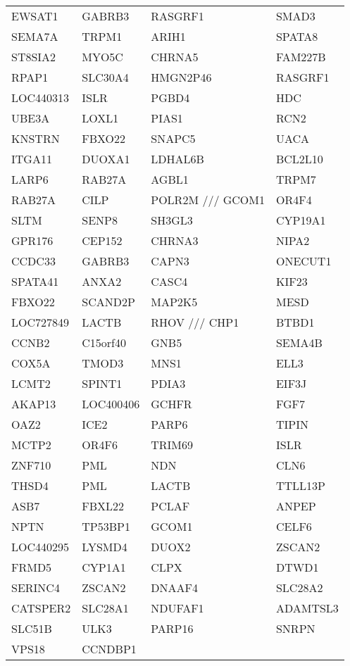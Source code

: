 {\begin{longtable}{llll}
EWSAT1&GABRB3&RASGRF1&SMAD3\tabularnewline
SEMA7A&TRPM1&ARIH1&SPATA8\tabularnewline
ST8SIA2&MYO5C&CHRNA5&FAM227B\tabularnewline
RPAP1&SLC30A4&HMGN2P46&RASGRF1\tabularnewline
LOC440313&ISLR&PGBD4&HDC\tabularnewline
UBE3A&LOXL1&PIAS1&RCN2\tabularnewline
KNSTRN&FBXO22&SNAPC5&UACA\tabularnewline
ITGA11&DUOXA1&LDHAL6B&BCL2L10\tabularnewline
LARP6&RAB27A&AGBL1&TRPM7\tabularnewline
RAB27A&CILP&POLR2M /// GCOM1&OR4F4\tabularnewline
SLTM&SENP8&SH3GL3&CYP19A1\tabularnewline
GPR176&CEP152&CHRNA3&NIPA2\tabularnewline
CCDC33&GABRB3&CAPN3&ONECUT1\tabularnewline
SPATA41&ANXA2&CASC4&KIF23\tabularnewline
FBXO22&SCAND2P&MAP2K5&MESD\tabularnewline
LOC727849&LACTB&RHOV /// CHP1&BTBD1\tabularnewline
CCNB2&C15orf40&GNB5&SEMA4B\tabularnewline
COX5A&TMOD3&MNS1&ELL3\tabularnewline
LCMT2&SPINT1&PDIA3&EIF3J\tabularnewline
AKAP13&LOC400406&GCHFR&FGF7\tabularnewline
OAZ2&ICE2&PARP6&TIPIN\tabularnewline
MCTP2&OR4F6&TRIM69&ISLR\tabularnewline
ZNF710&PML&NDN&CLN6\tabularnewline
THSD4&PML&LACTB&TTLL13P\tabularnewline
ASB7&FBXL22&PCLAF&ANPEP\tabularnewline
NPTN&TP53BP1&GCOM1&CELF6\tabularnewline
LOC440295&LYSMD4&DUOX2&ZSCAN2\tabularnewline
\newpage
FRMD5&CYP1A1&CLPX&DTWD1\tabularnewline
SERINC4&ZSCAN2&DNAAF4&SLC28A2\tabularnewline
CATSPER2&SLC28A1&NDUFAF1&ADAMTSL3\tabularnewline
SLC51B&ULK3&PARP16&SNRPN\tabularnewline
VPS18&CCNDBP1&&\tabularnewline
\bottomrule
\end{longtable}}
\addtocounter{table}{-1}
